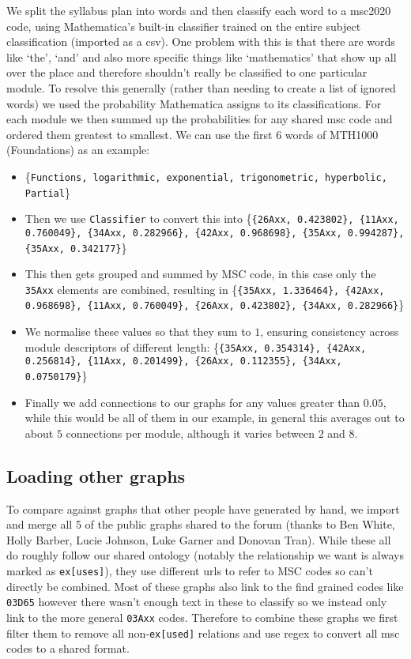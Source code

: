 \documentclass[english, 12pt]{article}
\begin{document}
We split the syllabus plan into words and then classify each word to a msc2020 code, using Mathematica's built-in classifier trained on the entire subject classification (imported as a csv). One problem with this is that there are words like `the', `and' and also more specific things like `mathematics' that show up all over the place and therefore shouldn't really be classified to one particular module. To resolve this generally (rather than needing to create a list of ignored words) we used the probability Mathematica assigns to its classifications. For each module we then summed up the probabilities for any shared msc code and ordered them greatest to smallest. We can use the first 6 words of MTH1000 (Foundations) as an example:
\begin{itemize}
	\item \{\texttt{Functions, logarithmic, exponential, trigonometric, hyperbolic, Partial}\}
	\item Then we use \texttt{Classifier} to convert this into \{\texttt{\{26Axx, 0.423802\}, \{11Axx, 0.760049\}, \{34Axx, 0.282966\}, \{42Axx, 0.968698\}, \{35Axx, 0.994287\}, \{35Axx, 0.342177\}}\}
	\item This then gets grouped and summed by MSC code, in this case only the \texttt{35Axx} elements are combined, resulting in \{\texttt{\{35Axx, 1.336464\}, \{42Axx, 0.968698\}, \{11Axx, 0.760049\}, \{26Axx, 0.423802\}, \{34Axx, 0.282966\}}\}
	\item We normalise these values so that they sum to $1$, ensuring consistency across module descriptors of different length: \{\texttt{\{35Axx, 0.354314\}, \{42Axx, 0.256814\}, \{11Axx, 0.201499\}, \{26Axx, 0.112355\}, \{34Axx, 0.0750179\}}\}
  	\item Finally we add connections to our graphs for any values greater than $0.05$, while this would be all of them in our example, in general this averages out to about $5$ connections per module, although it varies between $2$ and $8$.
\end{itemize}

\subsection*{Loading other graphs}
To compare against graphs that other people have generated by hand, we import and merge all 5 of the public graphs shared to the forum (thanks to Ben White, Holly Barber, Lucie Johnson, Luke Garner and Donovan Tran). While these all do roughly follow our shared ontology (notably the relationship we want is always marked as \texttt{ex[uses]}), they use different urls to refer to MSC codes so can't directly be combined. Most of these graphs also link to the find grained codes like \texttt{03D65} however there wasn't enough text in these to classify so we instead only link to the more general \texttt{03Axx} codes. Therefore to combine these graphs we first filter them to remove all non-\texttt{ex[used]} relations and use regex to convert all msc codes to a shared format.
\end{document}
